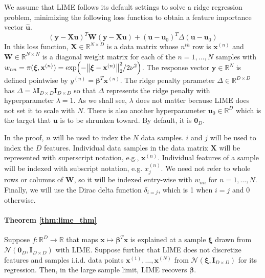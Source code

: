 \documentclass[mnsc,blindrev]{informs3}
\newcommand{\bu}{\mathbf{u}}
\newcommand{\bI}{\mathbf{I}}
\begin{document}
        We assume that LIME follows its default settings to solve a ridge regression problem, minimizing the following loss function to obtain a feature importance vector $\hat{\bu}$. 
        \begin{equation*}
            (\mathbf{y} - \mathbf{X}\mathbf{u})^T \mathbf{W}(\mathbf{y} - \mathbf{X}\mathbf{u}) + (\mathbf{u} - \mathbf{u}_0)^T \Delta(\mathbf{u} - \mathbf{u}_0)
        \end{equation*}
        In this loss function, $\mathbf{X} \in \mathbb{R}^{N\times D}$ is a data matrix  whose $n^{th}$ row is $\mathbf{x}^{(n)}$ and $\mathbf{W} \in \mathbb{R}^{N\times N}$ is a diagonal weight matrix for each of the $n=1,\ldots,N$ samples with $w_{nn} = \pi(\boldsymbol{\xi},\mathbf{x}^{(n)}) = \exp(-\norm{\boldsymbol{\xi} - \mathbf{x}^{(n)}}_2^2/2\nu^2)$. The response vector $\mathbf{y}\in \mathbb{R}^N$ is defined pointwise by $y^{(n)} = \boldsymbol{\beta}^T \mathbf{x}^{(n)}$. The ridge penalty parameter $\Delta\in \mathbb{R}^{D\times D}$ has $\Delta = \lambda \bI_{D\times D} \bI_{D\times D}$ so that $\Delta$ represents the ridge penalty with hyperparameter $\lambda=1$. As we shall see, $\lambda$ does not matter because LIME does not set it to scale with $N$. There is also another hyperparameter $\mathbf{u}_0 \in \mathbb{R}^D$ which is the target that $\mathbf{u}$ is to be shrunken toward. By default, it is $\mathbf{0}_D$. 

        In the proof, $n$ will be used to index the $N$ data samples. $i$ and $j$ will be used to index the $D$ features. Individual data samples in the data matrix $\mathbf{X}$ will be represented with superscript notation, e.g., $\mathbf{x}^{(n)}$. Individual features of a sample will be indexed with subscript notation, e.g. $x^{(n)}_j$. We need not refer to whole rows or columns of $\mathbf{W}$, so it will be indexed entry-wise with $w_{nn}$ for $n=1,\ldots,N$. Finally, we will use the Dirac delta function $\delta_{i=j}$, which is 1 when $i=j$ and 0 otherwise. 

            \paragraph{\textbf{Theorem \ref{thm:lime_thm}}}
                Suppose $f:\mathbb{R}^D\rightarrow \mathbb{R}$ that maps $\mathbf{x} \mapsto \boldsymbol{\beta}^T \mathbf{x}$ is explained at a sample $\boldsymbol{\xi}$ drawn from $\mathcal{N}(\mathbf{0}_D, \bI_{D\times D})$ with LIME. Suppose further that LIME does not discretize features and samples i.i.d. data points $\mathbf{x}^{(1)},\ldots,\mathbf{x}^{(N)}$ from $ \mathcal{N}(\boldsymbol{\xi}, \bI_{D\times D})$ for its regression.
                 Then, in the large sample limit, LIME recovers $\boldsymbol{\beta}$.   
\end{document}

